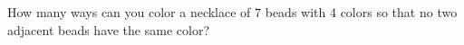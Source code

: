 How many ways can you color a necklace of $7$ beads with $4$ colors so that no two adjacent beads have the same color?